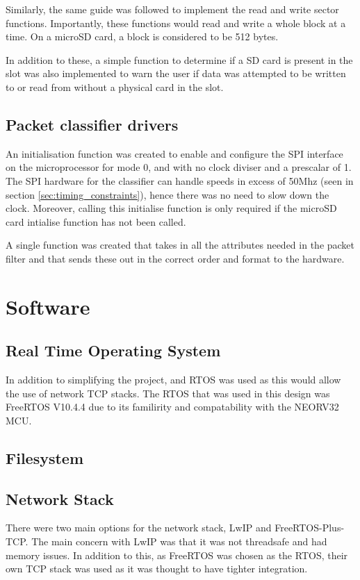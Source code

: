 Similarly, the same guide was followed to implement the read and write sector functions. Importantly, these functions would read and write a whole block at a time. On a microSD card, a block is considered to be 512 bytes. 


In addition to these, a simple function to determine if a SD card is present in the slot was also implemented to warn the user if data was attempted to be written to or read from without a physical card in the slot. 








\subsection{Packet classifier drivers}

An initialisation function was created to enable and configure the SPI interface on the microprocessor for mode 0, and with no clock diviser and a prescalar of 1. The SPI hardware for the classifier can handle speeds in excess of 50Mhz (seen in section \ref{sec:timing_constraints}), hence there was no need to slow down the clock. Moreover, calling this initialise function is only required if the microSD card intialise function has not been called. 

A single function was created that takes in all the attributes needed in the packet filter and that sends these out in the correct order and format to the hardware. 




\section{Software}



\subsection{Real Time Operating System}
In addition to simplifying the project, and RTOS was used as this would allow the use of network TCP stacks. The RTOS that was used in this design was FreeRTOS V10.4.4 due to its familirity and compatability with the NEORV32 MCU.

\subsection{Filesystem}

\subsection{Network Stack}
There were two main options for the network stack, LwIP and FreeRTOS-Plus-TCP. The main concern with LwIP was that it was not threadsafe and had memory issues. In addition to this, as FreeRTOS was chosen as the RTOS, their own TCP stack was used as it was thought to have tighter integration. 


